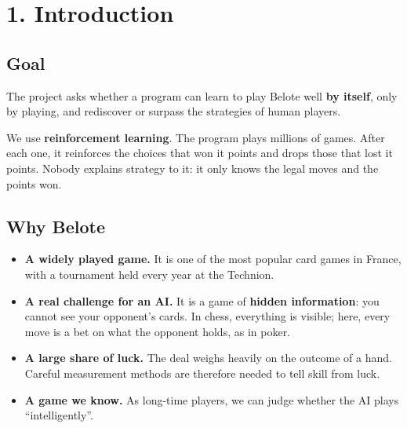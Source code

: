 \begin{abstract}\noindent We trained an artificial intelligence to play two-player Belote without giving it any strategy: it learned everything by playing against itself, using the PPO method. It wins \textbf{83}\textbf{\% }\textbf{of its games} against a player who plays at random and \textbf{62}\textbf{\%} against the best strategy we wrote by hand. This result is reproduced across three independent training runs. We then added trump bidding: early results show \textbf{73.5\% of games won} against that same strategy, and better bids than those of a hand-written rule.\end{abstract}

\section*{1. Introduction}

\subsection*{Goal}

The project asks whether a program can learn to play Belote well \textbf{by itself}, only by playing, and rediscover or surpass the strategies of human players.

We use \textbf{reinforcement learning}. The program plays millions of games. After each one, it reinforces the choices that won it points and drops those that lost it points. Nobody explains strategy to it: it only knows the legal moves and the points won.

\subsection*{Why Belote}

\begin{itemize}

  \item \textbf{A widely played game.} It is one of the most popular card games in France, with a tournament held every year at the Technion.

  \item \textbf{A real challenge for an AI.} It is a game of \textbf{hidden information}: you cannot see your opponent's cards. In chess, everything is visible; here, every move is a bet on what the opponent holds, as in poker.

  \item \textbf{A large share of luck.} The deal weighs heavily on the outcome of a hand. Careful measurement methods are therefore needed to tell skill from luck.

  \item \textbf{A game we know.} As long-time players, we can judge whether the AI plays ``intelligently''.

\end{itemize}


